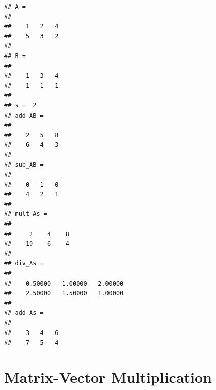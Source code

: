 \documentclass[
]{book}
\newenvironment{Shaded}{\begin{snugshade}}{\end{snugshade}}
\newcommand{\CommentTok}[1]{\textcolor[rgb]{0.56,0.35,0.01}{\textit{#1}}}
\newcommand{\FloatTok}[1]{\textcolor[rgb]{0.00,0.00,0.81}{#1}}
\newcommand{\NormalTok}[1]{#1}
\newcommand{\OperatorTok}[1]{\textcolor[rgb]{0.81,0.36,0.00}{\textbf{#1}}}
\begin{document}
\begin{Shaded}
\end{Shaded}

\begin{verbatim}
## A =
## 
##    1   2   4
##    5   3   2
## 
## B =
## 
##    1   3   4
##    1   1   1
## 
## s =  2
## add_AB =
## 
##    2   5   8
##    6   4   3
## 
## sub_AB =
## 
##    0  -1   0
##    4   2   1
## 
## mult_As =
## 
##     2    4    8
##    10    6    4
## 
## div_As =
## 
##    0.50000   1.00000   2.00000
##    2.50000   1.50000   1.00000
## 
## add_As =
## 
##    3   4   6
##    7   5   4
\end{verbatim}

\hypertarget{matrix-vector-multiplication}{%
\section{Matrix-Vector Multiplication}\label{matrix-vector-multiplication}}
\end{document}
